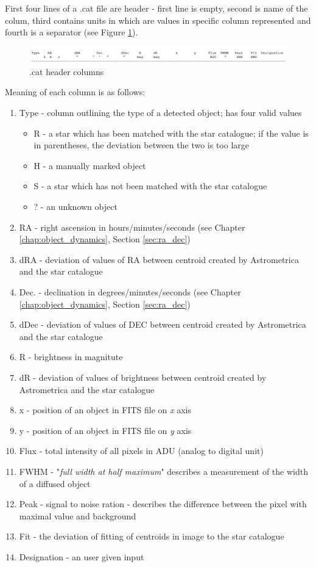 	First four lines of a .cat file are header - first line is empty, second is name of the colum, third contains units in which are values in specific column represented and fourth is a separator (see Figure \ref{fig:cat_header}).
	
	\begin{figure}[H]
	  \includegraphics[width=\linewidth]{images/cat_columns}
		  \caption{.cat header columns}
	  \label{fig:cat_header}
	\end{figure}
	
	Meaning of each column is as follows:
	
	\begin{enumerate}
		\item Type - column outlining the type of a detected object; has four valid values
		\begin{itemize}
			\item R - a star which has been matched with the star catalogue; if the value is in parentheses, the deviation between the two is too large
			\item H - a manually marked object
			\item S - a star which has not been matched with the star catalogue
			\item ? - an unknown object
		\end{itemize}
		\item RA - right ascension in hours/minutes/seconds (see Chapter \ref{chap:object_dynamics}, Section \ref{sec:ra_dec})
		\item dRA - deviation of values of RA between centroid created by Astrometrica and the star catalogue
		\item Dec. - declination in degrees/minutes/seconds (see Chapter \ref{chap:object_dynamics}, Section \ref{sec:ra_dec})
		\item dDec - deviation of values of DEC between centroid created by Astrometrica and the star catalogue
		\item R - brightness in magnitute
		\item dR - deviation of values of brightness between centroid created by Astrometrica and the star catalogue
		\item x - position of an object in FITS file on \emph{x} axis
		\item y - position of an object in FITS file on \emph{y} axis
		\item Flux - total intensity of all pixels in ADU (analog to digital unit)
		\item FWHM - "\emph{full width at half maximum}" describes a measurement of the width of a diffused object
		\item Peak - signal to noise ration - describes the difference between the pixel with maximal value and background
		\item Fit - the deviation of fitting of centroids in image to the star catalogue
		\item Designation - an user given input
	\end{enumerate}
	
